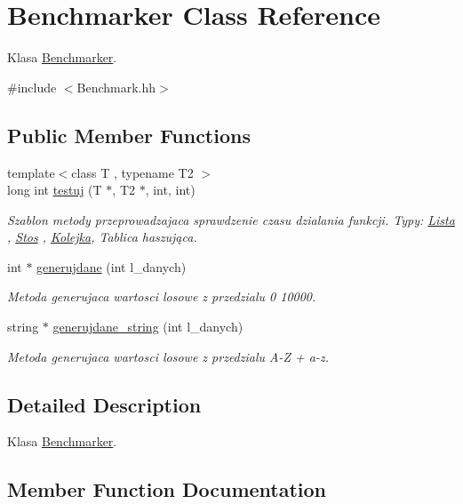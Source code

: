 \hypertarget{a00002}{}\section{Benchmarker Class Reference}
\label{a00002}


Klasa \hyperlink{a00002}{Benchmarker}.  




{\ttfamily \#include $<$Benchmark.\+hh$>$}

\subsection*{Public Member Functions}
\begin{DoxyCompactItemize}
\item 
{\footnotesize template$<$class T , typename T2 $>$ }\\long int \hyperlink{a00002_a50520ee5424974397b866548070d1c47}{testuj} (T $\ast$, T2 $\ast$, int, int)
\begin{DoxyCompactList}\small\item\em Szablon metody przeprowadzajaca sprawdzenie czasu dzialania funkcji. Typy\+: \hyperlink{a00005}{Lista} , \hyperlink{a00006}{Stos} , \hyperlink{a00004}{Kolejka}, Tablica haszująca. \end{DoxyCompactList}\item 
int $\ast$ \hyperlink{a00002_a8f93cdbd1a844b6a51842c1d438f5352}{generujdane} (int l\+\_\+danych)
\begin{DoxyCompactList}\small\item\em Metoda generujaca wartosci losowe z przedzialu 0 10000. \end{DoxyCompactList}\item 
string $\ast$ \hyperlink{a00002_af5c1417e405a81de8b1f185c755e3b82}{generujdane\+\_\+string} (int l\+\_\+danych)
\begin{DoxyCompactList}\small\item\em Metoda generujaca wartosci losowe z przedzialu A-\/\+Z + a-\/z. \end{DoxyCompactList}\end{DoxyCompactItemize}


\subsection{Detailed Description}
Klasa \hyperlink{a00002}{Benchmarker}. 

\subsection{Member Function Documentation}
\hypertarget{a00002_a8f93cdbd1a844b6a51842c1d438f5352}{}
